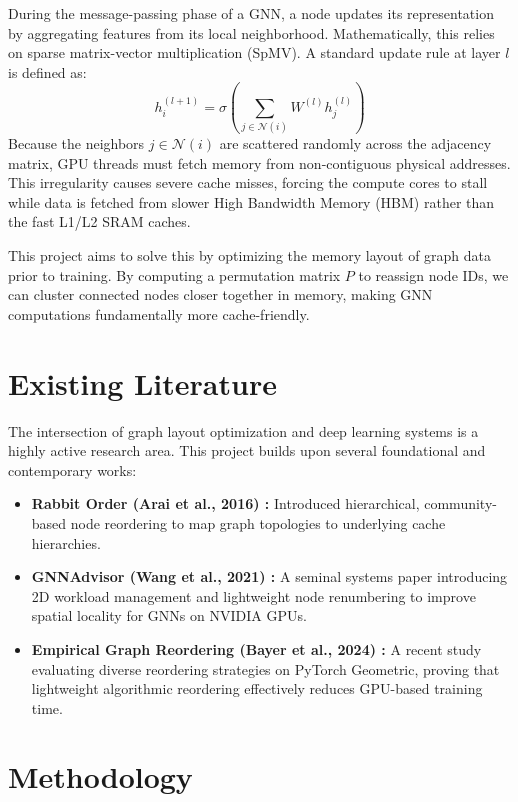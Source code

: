 \documentclass[sigconf,review]{acmart}
\begin{document}
During the message-passing phase of a GNN, a node updates its representation by aggregating features from its local neighborhood. Mathematically, this relies on sparse matrix-vector multiplication (SpMV). A standard update rule at layer $l$ is defined as:
\begin{equation}
    h_i^{(l+1)} = \sigma \left( \sum_{j \in \mathcal{N}(i)} W^{(l)} h_j^{(l)} \right)
\end{equation}
Because the neighbors $j \in \mathcal{N}(i)$ are scattered randomly across the adjacency matrix, GPU threads must fetch memory from non-contiguous physical addresses. This irregularity causes severe cache misses, forcing the compute cores to stall while data is fetched from slower High Bandwidth Memory (HBM) rather than the fast L1/L2 SRAM caches.

This project aims to solve this by optimizing the memory layout of graph data prior to training. By computing a permutation matrix $P$ to reassign node IDs, we can cluster connected nodes closer together in memory, making GNN computations fundamentally more cache-friendly.

\section{Existing Literature}
The intersection of graph layout optimization and deep learning systems is a highly active research area. This project builds upon several foundational and contemporary works:

\begin{itemize}
    \item \textbf{Rabbit Order (Arai et al., 2016) \cite{arai2016rabbit}:} Introduced hierarchical, community-based node reordering to map graph topologies to underlying cache hierarchies.
    \item \textbf{GNNAdvisor (Wang et al., 2021) \cite{wang2021gnnadvisor}:} A seminal systems paper introducing 2D workload management and lightweight node renumbering to improve spatial locality for GNNs on NVIDIA GPUs.
    \item \textbf{Empirical Graph Reordering (Bayer et al., 2024) \cite{bayer2024reordering}:} A recent study evaluating diverse reordering strategies on PyTorch Geometric, proving that lightweight algorithmic reordering effectively reduces GPU-based training time.
\end{itemize}

\section{Methodology}
\end{document}
